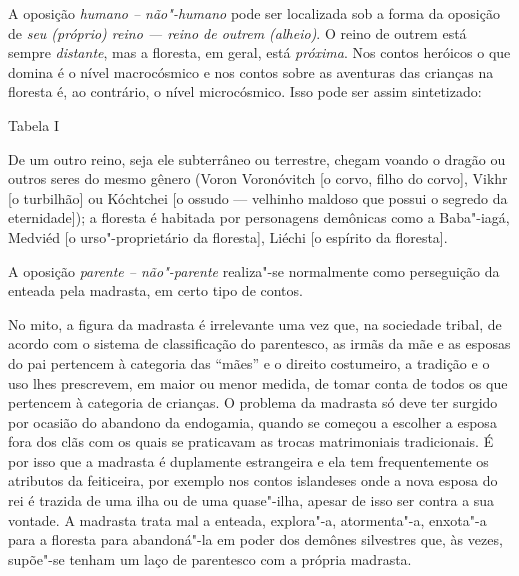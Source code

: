 A oposição \emph{humano -- não"-humano} pode ser localizada sob a forma da
oposição de \emph{seu (próprio) reino --- reino de outrem (alheio)}.
O reino de outrem está sempre \emph{distante}, mas a floresta,
em geral, está \emph{próxima}. Nos contos heróicos o que domina é o nível
macrocósmico e nos contos sobre as aventuras das crianças na floresta é,
ao contrário, o nível microcósmico. Isso pode ser assim sintetizado:


Tabela I

%
%
%
%


De um outro reino, seja ele subterrâneo ou terrestre, chegam voando o
dragão ou outros seres do mesmo gênero (Voron Voronóvitch [o corvo,
filho do corvo], Vikhr [o turbilhão] ou Kóchtchei [o ossudo ---
velhinho maldoso que possui o segredo da eternidade]); a floresta é
habitada por personagens demônicas como a Baba"-iagá, Medviéd [o
urso"-proprietário da floresta], Liéchi [o espírito da floresta].

A oposição \emph{parente -- não"-parente} realiza"-se normalmente como
perseguição da enteada pela madrasta, em certo tipo de contos.

No mito, a figura da madrasta é irrelevante uma vez que, na sociedade
tribal, de acordo com o sistema de classificação do parentesco, as irmãs
da mãe e as esposas do pai pertencem à categoria das ``mães'' e o
direito costumeiro, a tradição e o uso lhes prescrevem, em maior ou
menor medida, de tomar conta de todos os que pertencem à categoria de
crianças. O problema da madrasta só deve ter surgido por ocasião do
abandono da endogamia, quando se começou a escolher a esposa fora dos
clãs com os quais se praticavam as trocas matrimoniais tradicionais. É
por isso que a madrasta é duplamente estrangeira e ela tem
frequentemente os atributos da feiticeira, por exemplo nos contos
islandeses onde a nova esposa do rei é trazida de uma ilha ou de uma
quase"-ilha, apesar de isso ser contra a sua vontade. A madrasta trata
mal a enteada, explora"-a, atormenta"-a, enxota"-a para a floresta para
abandoná"-la em poder dos demônes silvestres que, às vezes, supõe"-se
tenham um laço de parentesco com a própria madrasta.

